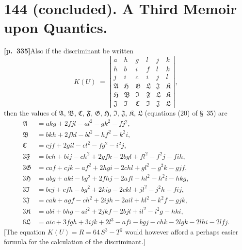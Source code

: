 \documentclass[11pt]{article}
\begin{document}
\section*{144 (concluded). A Third Memoir upon Quantics.}

\noindent\textbf{[p.~335]}\quad Also if the discriminant be written
\[
K(U) \;=\; \left|\begin{array}{cccccc}
a & h & g & l & j & k\\
h & b & i & f & l & k\\
j & i & c & i & j & l\\
\mathfrak{A} & \mathfrak{H} & \mathfrak{G} & \mathfrak{L} & \mathfrak{J} & \mathfrak{K}\\
\mathfrak{H} & \mathfrak{B} & \mathfrak{I} & \mathfrak{F} & \mathfrak{L} & \mathfrak{K}\\
\mathfrak{J} & \mathfrak{I} & \mathfrak{C} & \mathfrak{I} & \mathfrak{J} & \mathfrak{L}
\end{array}\right|,
\]
then the values of $\mathfrak{A}$, $\mathfrak{B}$, $\mathfrak{C}$, $\mathfrak{F}$, $\mathfrak{G}$, $\mathfrak{H}$, $\mathfrak{I}$, $\mathfrak{J}$, $\mathfrak{K}$, $\mathfrak{L}$ (equations (20) of \S~35) are
\begin{align*}
\mathfrak{A} &= akg + 2fjl - al^{2} - gk^{2} - fj^{2},\\
\mathfrak{B} &= bkh + 2fkl - bl^{2} - hf^{2} - k^{2}i,\\
\mathfrak{C} &= cjf + 2gil - cl^{2} - fg^{2} - i^{2}j,\\
3\mathfrak{F} &= bch + bij - ch^{2} + 2gfk - 2bgl + fl^{2} - f^{2}j - fih,\\
3\mathfrak{G} &= caf + cjk - af^{2} + 2hgi - 2chl + gl^{2} - g^{2}k - gjf,\\
3\mathfrak{H} &= abg + aki - bg^{2} + 2fhj - 2afl + hl^{2} - h^{2}i - hkg,\\
3\mathfrak{I} &= bcj + cfh - bg^{2} + 2kig - 2ckl + jl^{2} - j^{2}h - fij,\\
3\mathfrak{J} &= cak + agf - ch^{2} + 2ijh - 2ail + kl^{2} - k^{2}f - gjk,\\
3\mathfrak{K} &= abi + bhg - ai^{2} + 2jkf - 2bjl + il^{2} - i^{2}g - hki,\\
6\mathfrak{L} &= aic + 3fgh + 3ijk + 2l^{3} - afi - bgj - chk - 2lgk - 2lhi - 2lfj.
\end{align*}
[The equation $K(U) = R = 64\, S^{3} - T^{2}$ would however afford a perhaps easier formula for the calculation of the discriminant.]
\end{document}
